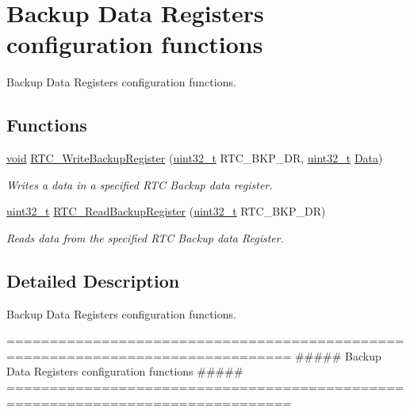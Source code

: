 \hypertarget{group___r_t_c___group10}{\section{Backup Data Registers configuration functions}
\label{group___r_t_c___group10}
}


Backup Data Registers configuration functions.  


\subsection*{Functions}
\begin{DoxyCompactItemize}
\item 
\hyperlink{group___n_a_m_e_ga18028b8badbf1ea7e704ccac3c488e82}{void} \hyperlink{group___r_t_c___group10_gaa1241e2b47d04acc116b50d7b031c3aa}{R\-T\-C\-\_\-\-Write\-Backup\-Register} (\hyperlink{stdint_8h_a435d1572bf3f880d55459d9805097f62}{uint32\-\_\-t} R\-T\-C\-\_\-\-B\-K\-P\-\_\-\-D\-R, \hyperlink{stdint_8h_a435d1572bf3f880d55459d9805097f62}{uint32\-\_\-t} \hyperlink{group___copter_control_b_l_ga6f3335509cc4943e20df66f72483910c}{Data})
\begin{DoxyCompactList}\small\item\em Writes a data in a specified R\-T\-C Backup data register. \end{DoxyCompactList}\item 
\hyperlink{stdint_8h_a435d1572bf3f880d55459d9805097f62}{uint32\-\_\-t} \hyperlink{group___r_t_c___group10_ga504489fd91a66e392beb82bb8230b37f}{R\-T\-C\-\_\-\-Read\-Backup\-Register} (\hyperlink{stdint_8h_a435d1572bf3f880d55459d9805097f62}{uint32\-\_\-t} R\-T\-C\-\_\-\-B\-K\-P\-\_\-\-D\-R)
\begin{DoxyCompactList}\small\item\em Reads data from the specified R\-T\-C Backup data Register. \end{DoxyCompactList}\end{DoxyCompactItemize}


\subsection{Detailed Description}
Backup Data Registers configuration functions. \begin{DoxyVerb} ===============================================================================
          ##### Backup Data Registers configuration functions #####
 ===============================================================================  \end{DoxyVerb}


